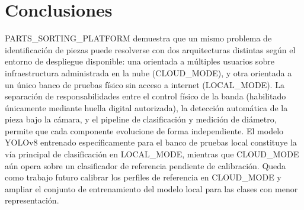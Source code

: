 \section{Conclusiones}
\label{sec:conclusiones}

PARTS\_SORTING\_PLATFORM demuestra que un mismo problema de
identificación de piezas puede resolverse con dos arquitecturas
distintas según el entorno de despliegue disponible: una orientada a
múltiples usuarios sobre infraestructura administrada en la nube
(CLOUD\_MODE), y otra orientada a un único banco de pruebas físico sin
acceso a internet (LOCAL\_MODE). La separación de responsabilidades
entre el control físico de la banda (habilitado únicamente mediante
huella digital autorizada), la detección automática de la pieza bajo
la cámara, y el pipeline de clasificación y medición de diámetro,
permite que cada componente evolucione de forma independiente. El
modelo YOLOv8 entrenado específicamente para el banco de pruebas local
constituye la vía principal de clasificación en LOCAL\_MODE, mientras
que CLOUD\_MODE aún opera sobre un clasificador de referencia pendiente
de calibración. Queda como trabajo futuro calibrar los perfiles de
referencia en CLOUD\_MODE y ampliar el conjunto de entrenamiento del
modelo local para las clases con menor representación.
